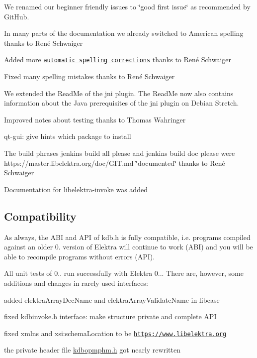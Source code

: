 \begin{DoxyItemize}
\item We renamed our beginner friendly issues to \char`\"{}good first issue\char`\"{} as recommended by Git\+Hub.
\item In many parts of the documentation we already switched to American spelling thanks to René Schwaiger
\item Added more \href{https://master.libelektra.org/scripts/sed}{\tt automatic spelling corrections} thanks to René Schwaiger
\item Fixed many spelling mistakes thanks to René Schwaiger
\item We extended the Read\+Me of the {\ttfamily jni} plugin. The Read\+Me now also contains information about the Java prerequisites of the {\ttfamily jni} plugin on Debian Stretch.
\item Improved notes about testing thanks to Thomas Wahringer
\item qt-\/gui\+: give hints which package to install
\item The build phrases {\ttfamily jenkins build all please} and {\ttfamily jenkins build doc please} were https\+://master.libelektra.\+org/doc/\+G\+IT.md \char`\"{}documented\char`\"{} thanks to René Schwaiger
\item Documentation for libelektra-\/invoke was added
\end{DoxyItemize}

\subsection*{Compatibility}

As always, the A\+BI and A\+PI of kdb.\+h is fully compatible, i.\+e. programs compiled against an older 0. version of Elektra will continue to work (A\+BI) and you will be able to recompile programs without errors (A\+PI).

All unit tests of 0.. run successfully with Elektra 0... There are, however, some additions and changes in rarely used interfaces\+:


\begin{DoxyItemize}
\item added {\ttfamily elektra\+Array\+Dec\+Name} and {\ttfamily elektra\+Array\+Validate\+Name} in libease
\item fixed {\ttfamily kdbinvoke.\+h} interface\+: make structure private and complete A\+PI
\item fixed {\ttfamily xmlns} and {\ttfamily xsi\+:schema\+Location} to be {\ttfamily \href{https://www.libelektra.org}{\tt https\+://www.\+libelektra.\+org}}
\item the private header file {\ttfamily \hyperlink{kdbopmphm_8h}{kdbopmphm.\+h}} got nearly rewritten
\end{DoxyItemize}

